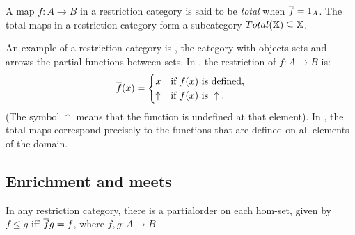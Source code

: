 A map $f:A\to B$ in a restriction category is said to be \emph{total} when
$\overline{f} = 1_A$. The total maps in a restriction category form a subcategory
$Total(\mathbb{X}) \subseteq \mathbb{X}$.

An example of a restriction category is \Par, the category with objects sets and arrows the 
partial functions between sets. In \Par, the restriction of $f:A\to B$ is:
\[
  \overline{f}(x) =
  \begin{cases}
    x&\text{if $f(x)$ is defined,}\\
    \uparrow&\text{if }f(x)\text{ is }\uparrow.
  \end{cases}
\]
(The symbol $\uparrow$ means that the function is undefined at that element). In \Par, the
total maps correspond precisely to the functions that are defined on all elements of the domain.


\subsection{Enrichment and meets} %
\label{sub:enrichment_and_meets}


In any restriction category, there is a partialorder on each hom-set, given by $f \le g$ iff
$\overline{f} g = f$, where $f,g:A\to B$.

